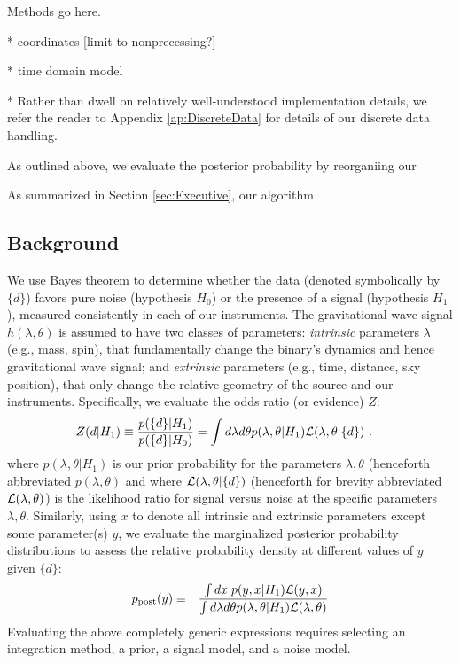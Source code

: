 Methods go here.

* coordinates [limit to nonprecessing?]

* time domain model

* Rather than dwell on relatively well-understood implementation details,  we refer the reader to  Appendix \ref{ap:DiscreteData} for
details of our discrete data handling.

As outlined above, we evaluate the posterior probability by reorganiing our


As summarized in Section \ref{sec:Executive}, our algorithm 


\subsection{Background}




We use Bayes theorem to determine whether the data (denoted symbolically by $\{ d\}$) favors pure noise (hypothesis
$H_0$) or the presence of a signal (hypothesis $H_1$), measured consistently in each of our instruments.  The
gravitational wave signal $h(\lambda,\theta)$ is assumed to have two classes of parameters:
\emph{intrinsic} parameters $\lambda$ (e.g., mass, spin), that fundamentally change the binary's dynamics and hence
gravitational wave signal; and \emph{extrinsic} parameters (e.g., time, distance, sky position), that only change the relative
geometry of the source and our instruments.  Specifically, we evaluate   the odds ratio (or evidence) $Z$:
\begin{align}
\label{eq:def:Z:Modified}
Z(d|H_1) &\equiv \frac{p(\{d\}|H_1)}{p(\{d\}|H_0)} 
  = \int d\lambda d\theta p(\lambda,\theta|H_1) {\cal L}(\lambda,\theta|\{d\})\ .
\end{align}
where  $p(\lambda,\theta|H_1)$ is our prior probability for the parameters $\lambda,\theta$ (henceforth abbreviated
$p(\lambda,\theta)$ and where ${\cal L}(\lambda,\theta|\{ d\})$ (henceforth for brevity abbreviated ${\cal L}(\lambda,\theta)$) is the likelihood ratio for signal versus noise at the specific parameters
$\lambda,\theta$.  
Similarly, using $x$ to denote all intrinsic and extrinsic parameters except some parameter(s) $y$, we evaluate the marginalized posterior
probability distributions to assess the relative probability density at different values of $y$ given $\{ d\}$:
\begin{eqnarray}
\label{eq:def:Posterior}
p_{\rm post}(y) &\equiv& \frac{\int dx \;  p(y,x|H_1) {\cal L}(y,x)}{ \int d\lambda d\theta p(\lambda,\theta|H_1) {\cal L}(\lambda,\theta)}
\end{eqnarray}
%
Evaluating the above completely generic expressions requires selecting an integration method, a prior,  a signal model, and a
noise model.  


